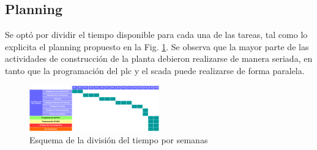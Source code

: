 \subsection{Planning}
Se optó por dividir el tiempo disponible para cada una de las tareas, tal como
lo
explicita el planning propuesto en la Fig. \ref{fig:EDT}.
Se observa que la mayor parte de las actividades de construcción de la planta
debieron realizarse de manera seriada, en tanto que la programación del
\gls{plc} y el \gls{scada} puede realizarse de forma paralela.
\begin{figure}[ht!]
	\centering
	\includegraphics[angle=90,
		width=0.501\textwidth]{Cap1-Introduccion/images/EDT.pdf}
	\caption{Esquema de la división del tiempo por semanas}
	\label{fig:EDT}
\end{figure}

